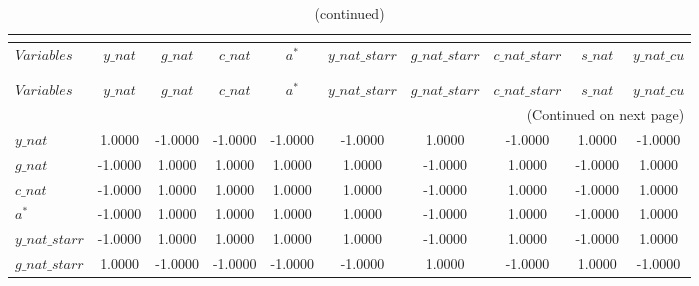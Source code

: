  
\begin{center}
\begin{longtable}{lccccccccc} 
\caption{MATRIX OF CORRELATIONS}\\
 \label{Table:th_corr_matrix}\\
\toprule 
$Variables      $	 & 	 $          y\_nat$	 & 	 $          g\_nat$	 & 	 $          c\_nat$	 & 	 $            {a^*}$	 & 	 $  y\_nat\_starr$	 & 	 $  g\_nat\_starr$	 & 	 $  c\_nat\_starr$	 & 	 $          s\_nat$	 & 	 $     y\_nat\_cu$\\
\midrule \endfirsthead 
\caption{(continued)}\\
 \toprule \\ 
$Variables      $	 & 	 $          y\_nat$	 & 	 $          g\_nat$	 & 	 $          c\_nat$	 & 	 $            {a^*}$	 & 	 $  y\_nat\_starr$	 & 	 $  g\_nat\_starr$	 & 	 $  c\_nat\_starr$	 & 	 $          s\_nat$	 & 	 $     y\_nat\_cu$\\
\midrule \endhead 
\midrule \multicolumn{10}{r}{(Continued on next page)} \\ \bottomrule \endfoot 
\bottomrule \endlastfoot 
$y\_nat         $	 & 	           1.0000	 & 	          -1.0000	 & 	          -1.0000	 & 	          -1.0000	 & 	          -1.0000	 & 	           1.0000	 & 	          -1.0000	 & 	           1.0000	 & 	          -1.0000 \\ 
$g\_nat         $	 & 	          -1.0000	 & 	           1.0000	 & 	           1.0000	 & 	           1.0000	 & 	           1.0000	 & 	          -1.0000	 & 	           1.0000	 & 	          -1.0000	 & 	           1.0000 \\ 
$c\_nat         $	 & 	          -1.0000	 & 	           1.0000	 & 	           1.0000	 & 	           1.0000	 & 	           1.0000	 & 	          -1.0000	 & 	           1.0000	 & 	          -1.0000	 & 	           1.0000 \\ 
${a^*}          $	 & 	          -1.0000	 & 	           1.0000	 & 	           1.0000	 & 	           1.0000	 & 	           1.0000	 & 	          -1.0000	 & 	           1.0000	 & 	          -1.0000	 & 	           1.0000 \\ 
$y\_nat\_starr  $	 & 	          -1.0000	 & 	           1.0000	 & 	           1.0000	 & 	           1.0000	 & 	           1.0000	 & 	          -1.0000	 & 	           1.0000	 & 	          -1.0000	 & 	           1.0000 \\ 
$g\_nat\_starr  $	 & 	           1.0000	 & 	          -1.0000	 & 	          -1.0000	 & 	          -1.0000	 & 	          -1.0000	 & 	           1.0000	 & 	          -1.0000	 & 	           1.0000	 & 	          -1.0000 \\ 

\end{longtable}
\end{center}
